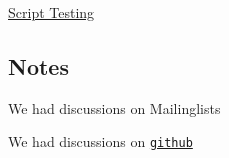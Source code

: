 \begin{DoxyItemize}
\item \hyperlink{doc_decisions_script_testing_md}{Script Testing}
\end{DoxyItemize}

\subsection*{Notes}


\begin{DoxyItemize}
\item We had discussions on Mailinglists
\item We had discussions on \href{https://github.com/ElektraInitiative/libelektra/pull/26}{\tt github} 
\end{DoxyItemize}